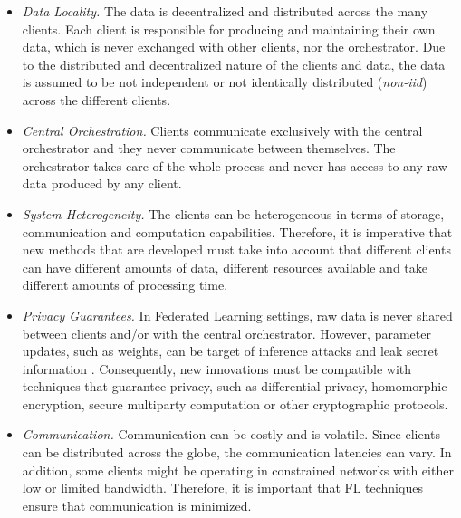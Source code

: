 \begin{itemize}
    \item \textit{Data Locality.} The data is decentralized and distributed across the many clients. Each client is responsible for producing and maintaining their own data, which is never exchanged with other clients, nor the orchestrator. Due to the distributed and decentralized nature of the clients and data, the data is assumed to be not independent or not identically distributed (\textit{non-iid}) across the different clients.
    
    \item \textit{Central Orchestration.} Clients communicate exclusively with the central orchestrator and they never communicate between themselves. The orchestrator takes care of the whole process and never has access to any raw data produced by any client.
    
    \item \textit{System Heterogeneity.} The clients can be heterogeneous in terms of storage, communication and computation capabilities. Therefore, it is imperative that new methods that are developed must take into account that different clients can have different amounts of data, different resources available and take different amounts of processing time.
    
    \item \textit{Privacy Guarantees.} In Federated Learning settings, raw data is never shared between clients and/or with the central orchestrator. However, parameter updates, such as weights, can be target of inference attacks and leak secret information \cite{10.1145/3298981}. Consequently, new innovations must be compatible with techniques that guarantee privacy, such as differential privacy, homomorphic encryption, secure multiparty computation or other cryptographic protocols.
    
    \item \textit{Communication.} Communication can be costly and is volatile. Since clients can be distributed across the globe, the communication latencies can vary. In addition, some clients might be operating in constrained networks with either low or limited bandwidth. Therefore, it is important that FL techniques ensure that communication is minimized.

\end{itemize}

